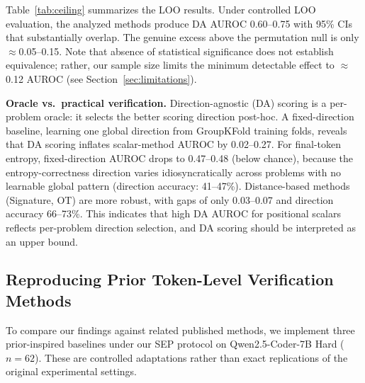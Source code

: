 \documentclass{article}
\begin{document}
Table~\ref{tab:ceiling} summarizes the LOO results. Under controlled LOO evaluation, the analyzed methods produce DA AUROC 0.60--0.75 with 95\% CIs that substantially overlap. The genuine excess above the permutation null is only $\approx$0.05--0.15. Note that absence of statistical significance does not establish equivalence; rather, our sample size limits the minimum detectable effect to $\approx$0.12 AUROC (see Section~\ref{sec:limitations}).

\textbf{Oracle vs.\ practical verification.} Direction-agnostic (DA) scoring is a per-problem oracle: it selects the better scoring direction post-hoc. A fixed-direction baseline, learning one global direction from GroupKFold training folds, reveals that DA scoring inflates scalar-method AUROC by 0.02--0.27. For final-token entropy, fixed-direction AUROC drops to 0.47--0.48 (below chance), because the entropy-correctness direction varies idiosyncratically across problems with no learnable global pattern (direction accuracy: 41--47\%). Distance-based methods (Signature, OT) are more robust, with gaps of only 0.03--0.07 and direction accuracy 66--73\%. This indicates that high DA AUROC for positional scalars reflects per-problem direction selection, and DA scoring should be interpreted as an upper bound.

\subsection{Reproducing Prior Token-Level Verification Methods}
\label{sec:repro}

To compare our findings against related published methods, we implement three prior-inspired baselines under our SEP protocol on Qwen2.5-Coder-7B Hard ($n{=}62$). These are controlled adaptations rather than exact replications of the original experimental settings.
\end{document}
